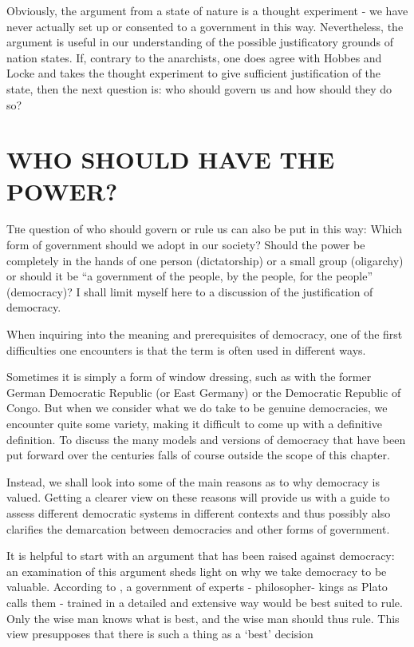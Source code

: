 \documentclass[11pt]{article}
\begin{document}
Obviously, the argument from a state of nature is a thought experiment - we have never actually set up or consented to a government in this way. Nevertheless,
the argument is useful in our understanding of the possible justificatory grounds of nation states. If, contrary to the anarchists, one does agree with Hobbes and Locke and takes the thought experiment to give sufficient justification of the state, then the next question is: who should govern us and how should they do so?
\section{WHO SHOULD HAVE THE POWER?}

\lettrine[lines=3]{T}he question of who should govern or rule us can also be put in this way:
Which form of government should we adopt in our society? Should the power be completely in the hands of one person (dictatorship) or a small group (oligarchy) or should it be “a government of the people, by the people,
for the people” (democracy)? I shall limit myself here to a discussion of the justification of democracy.

When inquiring into the meaning and prerequisites of democracy, one of the first difficulties one encounters is that the term is often used in different ways.

Sometimes it is simply a form of window dressing, such as with the former German Democratic Republic (or East Germany) or the Democratic Republic of Congo. But when we consider what we do take to be genuine democracies,
we encounter quite some variety, making it difficult to come up with a definitive definition. To discuss the many models and versions of democracy that have been put forward over the centuries falls of course outside the scope of this chapter.

Instead, we shall look into some of the main reasons as to why democracy is valued. Getting a clearer view on these reasons will provide us with a guide to assess different democratic systems in different contexts and thus possibly also clarifies the demarcation between democracies and other forms of government.

It is helpful to start with an argument that has been raised against democracy:
an examination of this argument sheds light on why we take democracy to be valuable. According to \textcite{Plato-366}, a government of experts - philosopher-
kings as Plato calls them - trained in a detailed and extensive way would be best suited to rule. Only the wise man knows what is best, and the wise man should thus rule. This view presupposes that there is such a thing as a ‘best’ decision
\end{document}
